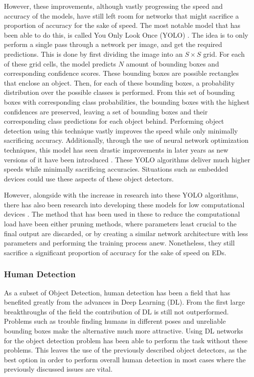 However, these improvements, although vastly progressing the speed and accuracy of the 
models, have still left room for networks that might sacrifice a proportion of accuracy 
for the sake of speed. The most notable model that has been able to do this, is called 
You Only Look Once (YOLO) \cite{originalyolo}. The idea is to only perform a single pass 
through a network per image, and get the required predictions. This is done by first 
dividing the image into an $S \times S$ grid. For each of these grid cells, the model 
predicts $N$ amount of bounding boxes and corresponding confidence scores. These 
bounding boxes are possible rectangles that enclose an object. Then, for each of these 
bounding boxes, a probability distribution over the possible classes is performed. 
From this set of bounding boxes with corresponding class probabilities, the bounding 
boxes with the highest confidences are preserved, leaving a set of bounding boxes and 
their corresponding class predictions for each object behind. Performing object detection 
using this technique vastly improves the speed while only minimally sacrificing accuracy.
Additionally, through the use of neural network optimization techniques, this model has 
seen drastic improvements in later years as new versions of it have been introduced \cite{yolo9000,yolov3, YOLOv4}.
These YOLO algorithms deliver much higher speeds while minimally sacrificing accuracies. 
Situations such as embedded devices could use these aspects of these object detectors. 

However, alongside with the increase in research into these 
YOLO algorithms, there has also been research into developing these models for 
low computational devices \cite{YOLO-Lite,Mixed-Yolo_Lite, yolov3-tiny}. 
The method that has been used in these to reduce the computational load have been 
either pruning methods, where parameters least crucial to the final output are discarded,
or by creating a similar network architecture with less parameters and performing the training process anew. 
Nonetheless, they still sacrifice a 
significant proportion of accuracy for the sake of speed on EDs. 


\subsubsection{Human Detection}
As a subset of Object Detection, human detection has been a field that has benefited
greatly from the advances in Deep Learning (DL). From the first large breakthroughs of 
the field \cite{haarcascades, HOGdetection} the contribution of DL is still not 
outperformed. Problems such as trouble finding humans in different poses and unreliable 
bounding boxes make the alternative much more attractive. Using DL networks for the 
object detection problem has been able to perform the task without these problems. This 
leaves the use of the previously described object detectors, as the best option in order 
to perform overall human detection in most cases where the previously discussed issues 
are vital. 


